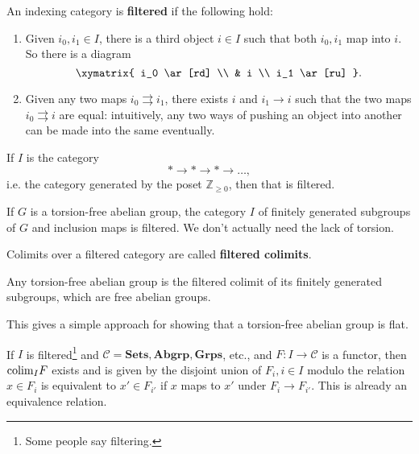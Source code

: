 \begin{definition}
An indexing category is \textbf{filtered} if the following hold:
\begin{enumerate}
\item Given $i_0, i_1 \in I$, there is a third object $i \in I$ such that both
$i_0, i_1$ map into $i$.
So there is a diagram
\[ \xymatrix{
i_0 \ar[rd] \\
& i \\
i_1 \ar[ru]
}.\]
\item Given any two maps $i_0 \rightrightarrows i_1$, there exists $i$ and $i_1
\to i$ such that the two maps $i_0 \rightrightarrows i$ are equal:
intuitively, any two ways
of pushing an object into another can be made into the same eventually.
\end{enumerate}
\end{definition}

\begin{example}
If $I$ is the category
\[ \ast \to \ast \to \ast \to \dots,  \]
i.e. the category generated by the poset $\mathbb{Z}_{\geq 0}$, then that is
filtered.
\end{example}


\begin{example}
If $G$ is a torsion-free abelian group, the category $I$ of finitely generated
subgroups of $G$ and inclusion maps is filtered. We don't actually need the
lack of torsion.
\end{example}

\begin{definition}
Colimits over a filtered category are called \textbf{filtered colimits}.
\end{definition}

\begin{example}
Any torsion-free abelian group is the filtered colimit of its finitely
generated subgroups, which are free abelian groups.
\end{example}
This gives a simple approach for showing that a torsion-free abelian group is
flat.

\begin{proposition}
If $I$ is filtered\footnote{Some people say filtering.} and $\mathcal{C} =
\mathbf{Sets}, \mathbf{Abgrp}, \mathbf{Grps}$, etc., and $F: I \to \mathcal{C}$
is a functor, then $\mathrm{colim}_I F$ exists and is given by the disjoint union of
$F_i, i \in I$ modulo the relation $x \in F_i$ is equivalent to $x' \in F_{i'}$
if $x$ maps to $x'$ under $F_i \to F_{i'}$. This is already an equivalence
relation.
\end{proposition}

